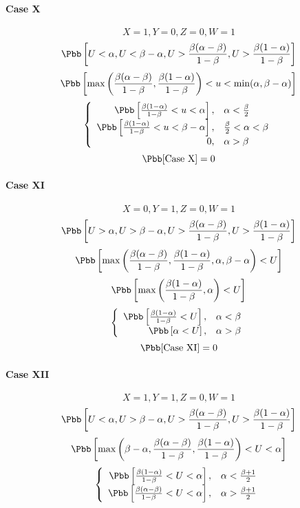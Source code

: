 \paragraph{Case X}
\[X = 1, Y = 0, Z = 0, W = 1\]
\[\Pbb\left[U < \alpha, U < \beta-\alpha, U > \frac{\beta(\alpha-\beta)}{1-\beta}, U > \frac{\beta(1-\alpha)}{1-\beta}\right]\]
\[\Pbb\left[\max\left(\frac{\beta(\alpha-\beta)}{1-\beta},\frac{\beta(1-\alpha)}{1-\beta}\right) < u < \min(\alpha,\beta-\alpha)\right]\]
\begin{displaymath}
\left\{\begin{array}{rl}
\Pbb\left[\frac{\beta(1-\alpha)}{1-\beta} < u < \alpha\right], & \alpha < \frac{\beta}{2}\\
\Pbb\left[\frac{\beta(1-\alpha)}{1-\beta} < u < \beta-\alpha\right], & \frac{\beta}{2} < \alpha < \beta \\
0, & \alpha > \beta
\end{array}\right.
\end{displaymath}
\[\Pbb[\mbox{Case X}] = 0\]

\paragraph{Case XI}
\[X = 0, Y = 1, Z = 0, W = 1\]
\[\Pbb\left[U > \alpha, U > \beta-\alpha, U > \frac{\beta(\alpha-\beta)}{1-\beta}, U > \frac{\beta(1-\alpha)}{1-\beta}\right]\]
\[\Pbb\left[\max\left(\frac{\beta(\alpha-\beta)}{1-\beta},\frac{\beta(1-\alpha)}{1-\beta},\alpha,\beta-\alpha\right) < U \right]\]
\[\Pbb\left[\max\left(\frac{\beta(1-\alpha)}{1-\beta},\alpha\right) < U\right]\]
\begin{displaymath}
\left\{\begin{array}{rl}
\Pbb\left[\frac{\beta(1-\alpha)}{1-\beta} < U \right], & \alpha < \beta\\
\Pbb\left[\alpha < U\right], & \alpha > \beta
\end{array}\right.
\end{displaymath}
\[\Pbb[\mbox{Case XI}] = 0\]

\paragraph{Case XII}
\[X = 1, Y = 1, Z = 0, W = 1\]
\[\Pbb\left[U < \alpha, U > \beta-\alpha, U > \frac{\beta(\alpha-\beta)}{1-\beta}, U > \frac{\beta(1-\alpha)}{1-\beta}\right]\]
\[\Pbb\left[\max\left(\beta-\alpha, \frac{\beta(\alpha-\beta)}{1-\beta}, \frac{\beta(1-\alpha)}{1-\beta}\right) < U < \alpha\right]\]
\begin{displaymath}
\left\{\begin{array}{rl}
\Pbb\left[\frac{\beta(1-\alpha)}{1-\beta} < U < \alpha\right], & \alpha < \frac{\beta + 1}{2}\\
\Pbb\left[\frac{\beta(\alpha-\beta)}{1-\beta} < U < \alpha\right], & \alpha > \frac{\beta + 1}{2}
\end{array}\right.
\end{displaymath}

